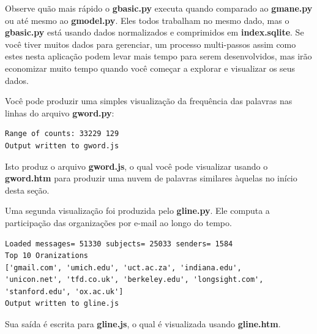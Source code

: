 Observe quão mais rápido o {\bf gbasic.py} executa quando comparado ao {\bf gmane.py}
ou até mesmo ao {\bf gmodel.py}. Eles todos trabalham no mesmo dado, mas o {\bf gbasic.py}
está usando dados normalizados e comprimidos em {\bf index.sqlite}. Se você tiver
muitos dados para gerenciar, um processo multi-passos assim como estes nesta aplicação
podem levar mais tempo para serem desenvolvidos, mas irão economizar muito tempo
quando você começar a explorar e visualizar os seus dados.

Você pode produzir uma simples visualização da frequência das palavras nas
linhas do arquivo {\bf gword.py}: 

\beforeverb
\begin{verbatim}
Range of counts: 33229 129
Output written to gword.js
\end{verbatim}
\afterverb
%

Isto produz o arquivo {\bf gword.js}, o qual você pode visualizar usando
o {\bf gword.htm} para produzir uma nuvem de palavras similares àquelas
no início desta seção.

Uma segunda visualização foi produzida pelo {\bf gline.py}. Ele computa a 
participação das organizações por e-mail ao longo do tempo. 

\beforeverb
\begin{verbatim}
Loaded messages= 51330 subjects= 25033 senders= 1584
Top 10 Oranizations
['gmail.com', 'umich.edu', 'uct.ac.za', 'indiana.edu', 
'unicon.net', 'tfd.co.uk', 'berkeley.edu', 'longsight.com', 
'stanford.edu', 'ox.ac.uk']
Output written to gline.js
\end{verbatim}
\afterverb
%

Sua saída é escrita para {\bf gline.js}, o qual é visualizada usando {\bf gline.htm}.

